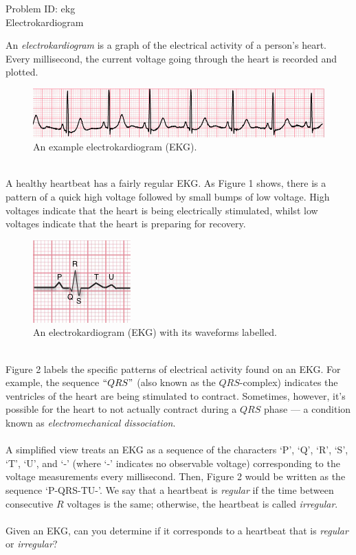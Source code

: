 \documentclass[a4paper,11pt]{article}
\begin{document}
\begin{center}
{\Huge Problem ID: ekg}\vspace{2 mm} \\	%
{\huge Electrokardiogram}\vspace{2 mm} \\	%
\end{center}
\setcounter{page}{5}
\large{
An \emph{electrokardiogram} is a graph of the electrical activity of a person's heart. Every millisecond, the current voltage going through the heart is recorded and plotted.
\begin{figure}[!htb]
    \centering
        \centering
        \includegraphics[width=0.8\linewidth, height=0.10\textheight]{ekgexample.png}
        \caption{An example electrokardiogram (EKG).}
\end{figure}
\\
A healthy heartbeat has a fairly regular EKG. As Figure 1 shows, there is a pattern of a quick high voltage followed by small bumps of low voltage. High voltages indicate that the heart is being electrically stimulated, whilst low voltages indicate that the heart is preparing for recovery. 
\begin{figure}[!htb]
    \centering
        \centering
        \includegraphics[width=0.4\linewidth, height=0.15\textheight]{ekg.png}
        \caption{An electrokardiogram (EKG) with its waveforms labelled.}
\end{figure}
\\ Figure 2 labels the specific patterns of electrical activity found on an EKG. For example, the sequence $``QRS"$ (also known as the $QRS$-complex) indicates the ventricles of the heart are being stimulated to contract. Sometimes, however, it's possible for the heart to not actually contract during a $QRS$ phase --- a condition known as \emph{electromechanical dissociation}. \\\\
A simplified view treats an EKG as a sequence of the characters `P', `Q', `R', `S', `T', `U', and `-' (where `-' indicates no observable voltage) corresponding to the voltage measurements every millisecond. Then, Figure 2 would be written as the sequence `P-QRS-TU-'. We say that a heartbeat is \emph{regular} if the time between consecutive $R$ voltages is the same; otherwise, the heartbeat is called \emph{irregular}.
\\\\
Given an EKG, can you determine if it corresponds to a heartbeat that is \emph{regular} or \emph{irregular}?
}
\end{document}
